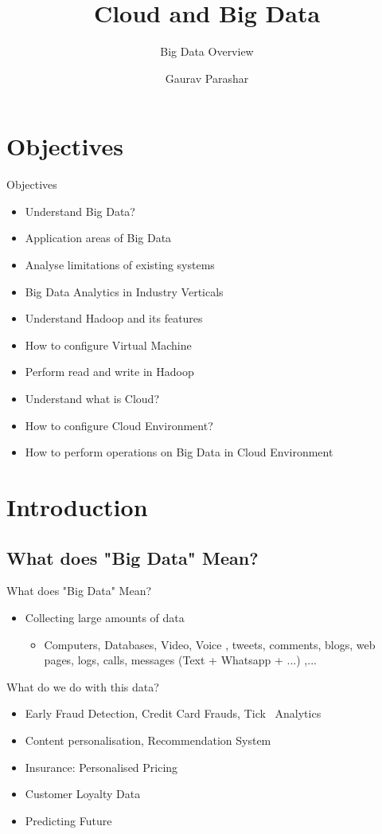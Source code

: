 \documentclass[pdf]{beamer}
\title{Cloud and Big Data}
\subtitle{Big Data Overview}
\author{Gaurav Parashar}
\begin{document}
\begin{frame}
	\thispagestyle{empty}
	\titlepage
\end{frame}
\addtocounter{framenumber}{-1}
\tableofcontents

\section{Objectives}
\begin{frame}{Objectives}
	\begin{itemize}
		\item Understand Big Data? \pause
		\item Application areas of Big Data \pause
		\item Analyse limitations of existing systems \pause
		\item Big Data Analytics in Industry Verticals \pause
		\item Understand Hadoop and its features \pause
		\item How to configure Virtual Machine \pause
		\item Perform read and write in Hadoop \pause
		\item Understand what is Cloud?\pause
		\item How to configure Cloud Environment? \pause
		\item How to perform operations on Big Data in Cloud Environment
	\end{itemize}
\end{frame}


\section{Introduction}

\subsection{What does "Big Data" Mean?}

\begin{frame}{What does "Big Data" Mean?}
	\begin{itemize}
		\pause
		\item Collecting large amounts of data
		\pause
		\begin{itemize}
			\item Computers, Databases, Video, Voice , tweets, comments, blogs, web pages, logs, calls, messages (Text + Whatsapp + ...) ,...
		\end{itemize}
	\end{itemize}
\pause
 What do we do with this data?	
\begin{itemize}
		\pause
		\item Early Fraud Detection, Credit Card Frauds, Tick~\cite{tic} Analytics 
		\pause
		\item Content personalisation, Recommendation System  
		\pause
		\item Insurance: Personalised Pricing
		\pause
		\item Customer Loyalty Data
		\pause
		\item Predicting Future
	\end{itemize}
\end{frame}
\end{document}
